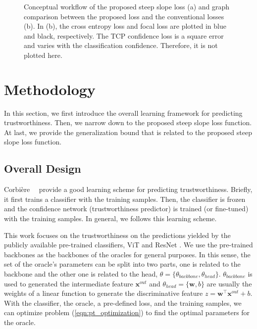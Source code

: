 \begin{figure}[!t]
	\centering
	 \hfill
	\caption{\label{fig:workflow}
    	Conceptual workflow of the proposed steep slope loss (a) and graph comparison between the proposed loss and the conventional losses (b). In (b), the cross entropy loss and focal loss are plotted in blue and black, respectively. The TCP confidence loss is a square error and varies with the classification confidence. Therefore, it is not plotted here.
    	}
\end{figure}

\section{Methodology}

In this section, we first introduce the overall learning framework for predicting trustworthiness. Then, we narrow down to the proposed steep slope loss function. At last, we provide the generalization bound that is related to the proposed steep slope loss function.

\subsection{Overall Design}

Corbi\`{e}re~\etal~\cite{Corbiere_NIPS_2019} provide a good learning scheme for predicting trustworthiness.
Briefly, it first trains a classifier with the training samples.
Then, the classifier is frozen and the confidence network (\ie trustworthiness predictor) is trained (or fine-tuned) with the training samples.
In general, we follows this learning scheme.

This work focuses on the trustworthiness on the predictions yielded by the  publicly available pre-trained classifiers, \ie ViT \cite{Dosovitskiy_ICLR_2021} and ResNet \cite{He_CVPR_2016}.
We use the pre-trained backbones as the backbones of the oracles for general purposes.
In this sense, the set of the oracle's parameters can be split into two parts, one is related to the backbone and the other one is related to the head, \ie $\theta = \{\theta_{backbone}, \theta_{head}\}$. $\theta_{backbone}$ is used to generated the intermediate feature $\bm{x}^{out}$ and $\theta_{head}=\{\bm{w},b\}$ are usually the weights of a linear function to generate the discriminative feature $z=\bm{w}^{\top}\bm{x}^{out}+b$. With the classifier, the oracle, a pre-defined loss, and the training samples, we can optimize problem (\ref{eqn:pt_optimization}) to find the optimal parameters for the oracle.

